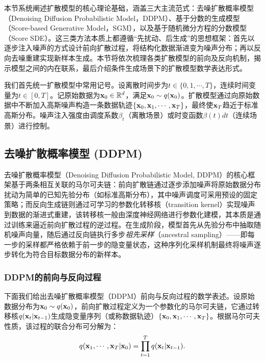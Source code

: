 \documentclass[11pt,a4paper,UTF8]{ctexart}
\begin{document}
本节系统阐述扩散模型的核心理论基础，涵盖三大主流范式：去噪扩散概率模型（Denoising Diffusion Probabilistic Model，DDPM）\cite{sohldickstein2015diffusion,ho2020denoising}、基于分数的生成模型（Score-based Generative Model，SGM）\cite{song2019generative,song2020improved}，以及基于随机微分方程的分数模型（Score SDE）\cite{song2020score,karras2022elucidating}。这三类方法本质上都遵循“先扰动、后生成”的思想框架：首先以逐步注入噪声的方式设计前向扩散过程，将结构化数据渐进变为噪声分布；再以反向去噪重建实现新样本生成。本节将依次梳理各类扩散模型的前向及反向机制，揭示模型之间的内在联系，最后介绍条件生成场景下的扩散模型数学表达形式。

我们首先统一扩散模型中常用记号。设离散时间步为$t\in\{0,1,\cdots,T\}$，连续时间变量为$t\in[0,T]$。记原始数据为$\mathbf{x}_0\in\mathbb{R}^d$，满足$\mathbf{x}_0\sim q(\mathbf{x}_0)$。扩散模型通过向原始数据中不断加入高斯噪声构造一条数据轨迹$\{\mathbf{x}_0,\mathbf{x}_1,\cdots,\mathbf{x}_T\}$，最终使$\mathbf{x}_T$趋近于标准高斯分布。噪声注入强度由调度系数$\beta_t$（离散场景）或时变函数$\beta(t)dt$（连续场景）进行控制。


\subsection{去噪扩散概率模型 (DDPM)}

去噪扩散概率模型（Denoising Diffusion Probabilistic Model, DDPM）的核心框架基于两条相互关联的马尔可夫链：前向扩散链通过逐步添加噪声将原始数据分布扰动为简单的已知先验分布（如标准高斯分布），其中噪声调度可采用预设的固定策略；而反向生成链则通过可学习的参数化转移核（transition kernel）实现噪声到数据的渐进式重建，该转移核一般由深度神经网络进行参数化建模，其本质是通过训练来逼近前向扩散过程的逆过程。在生成阶段，模型首先从先验分布中抽取随机噪声向量，随后通过反向链执行多步\emph{祖先采样}（ancestral sampling）\cite{koller2009probabilistic}——即每一步的采样都严格依赖于前一步的隐变量状态，这种序列化采样机制最终将噪声逐步转化为符合目标数据分布的新样本。

\subsubsection{DDPM的前向与反向过程}

下面我们给出去噪扩散概率模型（DDPM）前向与反向过程的数学表述。设原始数据分布为$\mathbf{x}_0\sim q(\mathbf{x}_0)$，前向扩散过程定义为一个参数化的马尔可夫链，它通过转移核$q(\mathbf{x}_t|\mathbf{x}_{t-1})$生成隐变量序列（或称数据轨迹）$\{\mathbf{x}_0,\mathbf{x}_1,\cdots,\mathbf{x}_T\}$。根据马尔可夫性质，该过程的联合分布可分解为：
\begin{equation*}
    q(\mathbf{x}_1,\cdots,\mathbf{x}_T|\mathbf{x}_0)=\prod_{t=1}^T q(\mathbf{x}_t|\mathbf{x}_{t-1}).
\end{equation*}
\end{document}
